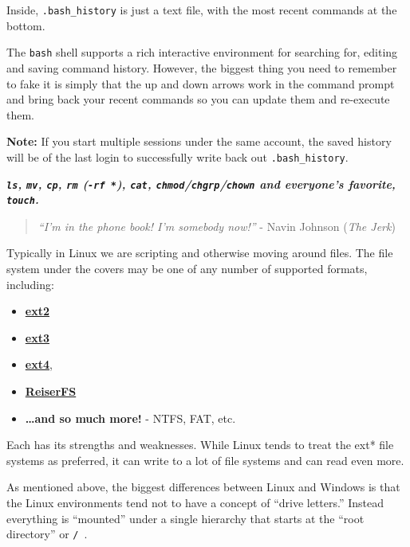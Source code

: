 \documentclass[10pt,]{book}
\numberwithin{figure}{chapter}
\DeclareRobustCommand{\fref}[1]{\ifxetex{(Figure \ref{fig:#1})}\fi}
\begin{document}
Inside, \texttt{.bash\_history} is just a text file, with the most
recent commands at the bottom.

The \texttt{bash} shell supports a rich interactive environment for
searching for, editing and saving command history. However, the biggest
thing you need to remember to fake it is simply that the up and down
arrows work in the command prompt and bring back your recent commands so
you can update them and re-execute them.

\textbf{Note:} If you start multiple sessions under the same account,
the saved history will be of the last login to successfully write back
out \texttt{.bash\_history}.


\textbf{\emph{\texttt{ls}, \texttt{mv}, \texttt{cp}, \texttt{rm}
(\texttt{-rf *}), \texttt{cat},
\texttt{chmod}/\texttt{chgrp}/\texttt{chown} and everyone's favorite,
\texttt{touch}.}}

\begin{quote}
\emph{``I'm in the phone book! I'm somebody now!''} - Navin Johnson
(\emph{The Jerk})
\end{quote}

Typically in Linux we are scripting and otherwise moving around files.
The file system under the covers may be one of any number of supported
formats, including:

\begin{itemize}
\item
  \href{https://en.wikipedia.org/wiki/Ext2}{\textbf{ext2}}
\item
  \href{https://en.wikipedia.org/wiki/Ext3}{\textbf{ext3}}
\item
  \href{https://en.wikipedia.org/wiki/Ext4}{\textbf{ext4}},
\item
  \href{https://en.wikipedia.org/wiki/ReiserFS}{\textbf{ReiserFS}}
\item
  \textbf{\ldots{}and so much more!} - NTFS, FAT, etc.
\end{itemize}

Each has its strengths and weaknesses. While Linux tends to treat the
ext* file systems as preferred, it can write to a lot of file systems
and can read even more.

As mentioned above, the biggest differences between Linux and Windows is
that the Linux environments tend not to have a concept of ``drive
letters.'' Instead everything is ``mounted'' under a single hierarchy
that starts at the ``root directory'' or \texttt{/}~\fref{ls-root}.
\end{document}
